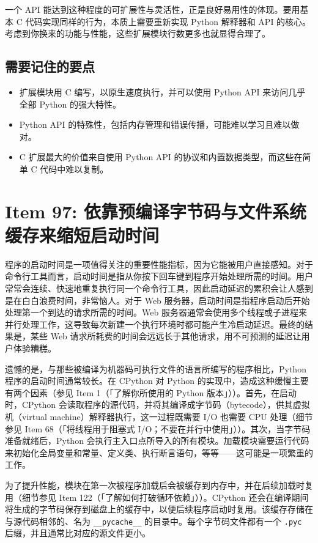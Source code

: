 一个 API 能达到这种程度的可扩展性与灵活性，正是良好易用性的体现。要用基本 C 代码实现同样的行为，本质上需要重新实现 Python 解释器和 API 的核心。考虑到你换来的功能与性能，这些扩展模块行数更多也就显得合理了。

\subsection{需要记住的要点}

\begin{itemize}
\item 扩展模块用 C 编写，以原生速度执行，并可以使用 Python API 来访问几乎全部 Python 的强大特性。
\item Python API 的特殊性，包括内存管理和错误传播，可能难以学习且难以做对。
\item C 扩展最大的价值来自使用 Python API 的协议和内置数据类型，而这些在简单 C 代码中难以复制。
\end{itemize}

\section{Item 97: 依靠预编译字节码与文件系统缓存来缩短启动时间}

程序的启动时间是一项值得关注的重要性能指标，因为它能被用户直接感知。对于命令行工具而言，启动时间是指从你按下回车键到程序开始处理所需的时间。用户常常会连续、快速地重复执行同一个命令行工具，因此启动延迟的累积会让人感到是在白白浪费时间，非常恼人。对于 Web 服务器，启动时间是指程序启动后开始处理第一个到达的请求所需的时间。Web 服务器通常会使用多个线程或子进程来并行处理工作，这导致每次新建一个执行环境时都可能产生冷启动延迟。最终的结果是，某些 Web 请求所耗费的时间会远远长于其他请求，用不可预测的延迟让用户体验糟糕。

遗憾的是，与那些被编译为机器码可执行文件的语言所编写的程序相比，Python 程序的启动时间通常较长。在 CPython 对 Python 的实现中，造成这种缓慢主要有两个因素（参见 Item 1（「了解你所使用的 Python 版本」））。首先，在启动时，CPython 会读取程序的源代码，并将其编译成字节码（bytecode），供其虚拟机（virtual machine）解释器执行，这一过程既需要 I/O 也需要 CPU 处理（细节参见 Item 68（「将线程用于阻塞式 I/O；不要在并行中使用」））。其次，当字节码准备就绪后，Python 会执行主入口点所导入的所有模块。加载模块需要运行代码来初始化全局变量和常量、定义类、执行断言语句，等等——这可能是一项繁重的工作。

为了提升性能，模块在第一次被程序加载后会被缓存到内存中，并在后续加载时复用（细节参见 Item 122（「了解如何打破循环依赖」））。CPython 还会在编译期间将生成的字节码保存到磁盘上的缓存中，以便后续程序启动时复用。该缓存存储在与源代码相邻的、名为 \texttt{\_\_pycache\_\_} 的目录中。每个字节码文件都有一个 \texttt{.pyc} 后缀，并且通常比对应的源文件更小。

